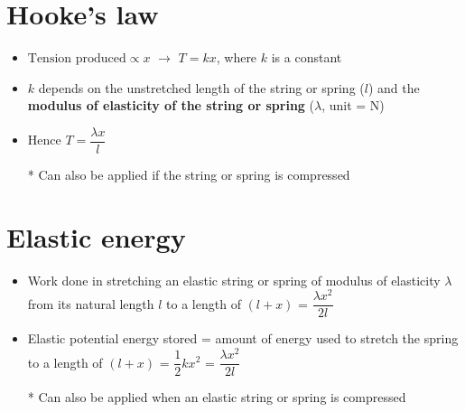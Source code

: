 \section{Hooke's law}
\begin{itemize}
    \item $\text{Tension produced}\propto x$ $\rightarrow$ $T=kx$, where $k$ is a constant
    \item $k$ depends on the unstretched length of the string or spring ($l$) and the \textbf{modulus of elasticity of the string or spring} ($\lambda$, unit = N)
    \item Hence $T=\dfrac{\lambda x}{l}$
    \item[*] Can also be applied if the string or spring is compressed
\end{itemize}

\section{Elastic energy}
\begin{itemize}
    \item Work done in stretching an elastic string or spring of modulus of elasticity $\lambda$ from its natural length $l$ to a length of $(l+x)$ = $\dfrac{\lambda x^2}{2l}$
    \item Elastic potential energy stored = amount of energy used to stretch the spring to a length of $(l+x)$ = $\dfrac{1}{2}kx^2$ = $\dfrac{\lambda x^2}{2l}$
    \item[*] Can also be applied when an elastic string or spring is compressed
\end{itemize}